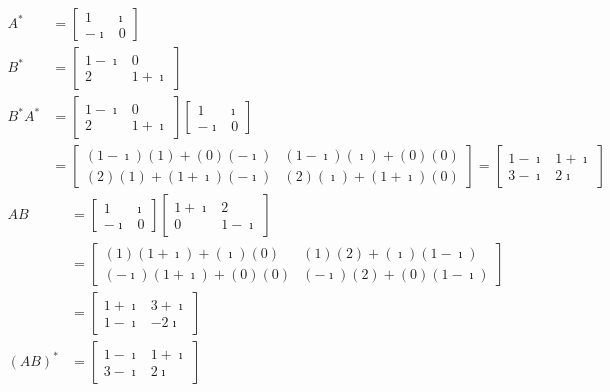 \begin{solution}
\begin{align*}
A^* &=
\begin{bmatrix}
1 & \imath \\
-\imath & 0
\end{bmatrix} \\
B^* &=
\begin{bmatrix}
1-\imath & 0 \\
2 & 1+\imath
\end{bmatrix} \\
B^*A^* &= 
\begin{bmatrix}
1-\imath & 0 \\
2 & 1+\imath
\end{bmatrix} 
\begin{bmatrix}
1 & \imath \\
-\imath & 0
\end{bmatrix} \\
&=
\begin{bmatrix}
(1-\imath)(1) + (0)(-\imath) & (1-\imath)(\imath) + (0)(0)  \\
(2)(1) + (1+\imath)(-\imath) & (2)(\imath) + (1+\imath)(0)
\end{bmatrix} 
=
\begin{bmatrix}
1-\imath & 1+\imath \\
3-\imath & 2\imath
\end{bmatrix} 
\end{align*}
\begin{align*}
AB &= 
\begin{bmatrix}
1 & \imath \\
-\imath & 0
\end{bmatrix} 
\begin{bmatrix}
1+\imath & 2 \\
0 & 1-\imath
\end{bmatrix} \\
&= 
\begin{bmatrix}
(1)(1+\imath)+(\imath)(0) & (1)(2) + (\imath)(1-\imath) \\
(-\imath)(1+\imath)+(0)(0) & (-\imath)(2) + (0)(1-\imath)
\end{bmatrix} \\
&= 
\begin{bmatrix}
1+\imath & 3+\imath \\
1-\imath & -2\imath
\end{bmatrix} \\
(AB)^* &= 
\begin{bmatrix}
1-\imath & 1+\imath \\
3-\imath & 2\imath
\end{bmatrix}
\end{align*}
\end{solution}

